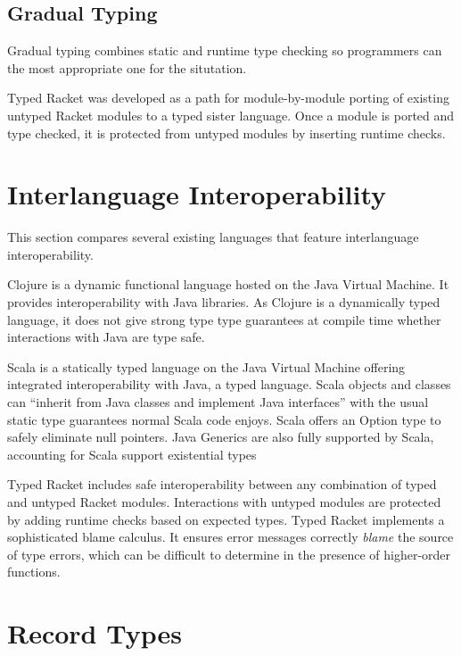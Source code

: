 
\subsection{Gradual Typing}

Gradual typing combines static and runtime type checking so programmers
can the most appropriate one for the situtation.

Typed Racket was developed as a path for module-by-module
porting of existing untyped Racket modules to a typed sister language\cite{Tob10}.
Once a module is ported and type checked, it is protected from untyped modules
by inserting runtime checks.

\section{Interlanguage Interoperability}

This section compares several existing languages that feature interlanguage interoperability.

Clojure is a dynamic functional language hosted on the Java Virtual Machine. It provides 
interoperability with Java libraries. As Clojure is a dynamically typed language, it does
not give strong type type guarantees at compile time whether interactions with Java
are type safe.

Scala is a statically typed language on the Java Virtual Machine offering integrated interoperability with Java, a typed language.
Scala objects and classes can ``inherit from Java classes and implement Java interfaces''\cite{OCD+}
with the usual static type guarantees normal Scala code enjoys.
Scala offers an Option type to safely eliminate null pointers.
Java Generics are also fully supported by Scala, accounting for Scala support existential types

Typed Racket includes safe interoperability between any combination of typed and untyped 
Racket modules\cite{Tob10}\cite{TF08}. 
Interactions with untyped modules are protected by adding runtime checks based on expected types.
Typed Racket implements a sophisticated blame calculus. It ensures 
error messages correctly \emph{blame} the source of type errors,
which can be difficult to determine in the presence of higher-order functions. %

\section{Record Types}

